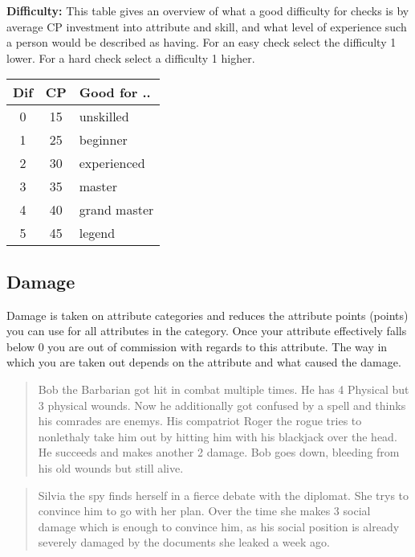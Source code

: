 \documentclass[11pt]{article}
\begin{document}
{\begin{multicols}{2}[]
\textbf{Difficulty:}
This table gives an overview of what a good difficulty for checks is by average CP investment into attribute and skill, and what level of experience such a person would be described as having. For an easy check select the difficulty 1 lower. For a hard check select a difficulty 1 higher.

\begin{center}
\begin{tabular}{c|c|l}
\textbf{Dif} & \textbf{CP} & \textbf{Good for ..}\\
\hline
0 & 15 & unskilled\\
1 & 25 & beginner\\
2 & 30 & experienced\\
3 & 35 & master\\
4 & 40 & grand master\\
5 & 45 & legend\\
\end{tabular}
\end{center}


\subsection{Damage}
\label{sec:org40fcd05}
Damage is taken on attribute categories and reduces the attribute points (points) you can use for all attributes in the category. Once your attribute effectively falls below 0 you are out of commission with regards to this attribute. The way in which you are taken out depends on the attribute and what caused the damage.

\begin{quote}
Bob the Barbarian got hit in combat multiple times. He has 4 Physical but 3 physical wounds. Now he additionally got confused by a spell and thinks his comrades are enemys. His compatriot Roger the rogue tries to nonlethaly take him out by hitting him with his blackjack over the head. He succeeds and makes another 2 damage. Bob goes down, bleeding from his old wounds but still alive.
\end{quote}

\begin{quote}
Silvia the spy finds herself in a fierce debate with the diplomat. She trys to convince him to go with her plan. Over the time she makes 3 social damage which is enough to convince him, as his social position is already severely damaged by the documents she leaked a week ago.
\end{quote}


\end{multicols}}
\end{document}

